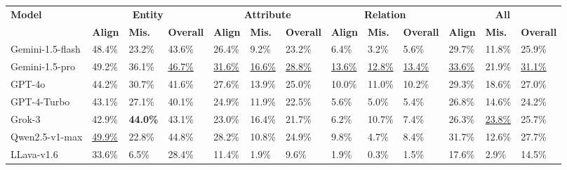 \documentclass[letterpaper]{article} %
\begin{document}
\begin{table}[t]
	\centering
	
	\small %
	\setlength{\tabcolsep}{1mm} %
	
	\begin{tabular}{l|lll|lll|lll|lll}
		\toprule
		\multirow{2}{*}[-0.7ex]{\textbf{Model}} & \multicolumn{3}{c|}{\textbf{Entity}} & \multicolumn{3}{c|}{\textbf{Attribute}} & \multicolumn{3}{c|}{\textbf{Relation}} & \multicolumn{3}{c}{\textbf{All}} \\
		\cmidrule(lr){2-4} \cmidrule(lr){5-7} \cmidrule(lr){8-10} \cmidrule(lr){11-13}
		
		& \textbf{Align} & \textbf{Mis.} & \textbf{Overall} & \textbf{Align} & \textbf{Mis.} & \textbf{Overall} & \textbf{Align} & \textbf{Mis.} & \textbf{Overall} & \textbf{Align} & \textbf{Mis.} & \textbf{Overall} \\
		\midrule
		
		Gemini-1.5-flash & 48.4\% & 23.2\% & 43.6\% & 26.4\% & 9.2\% & 23.2\% & 6.4\% & 3.2\% & 5.6\% & 29.7\% & 11.8\% & 25.9\% \\
		Gemini-1.5-pro   & 49.2\% & 36.1\% & \underline{46.7\%} & \underline{31.6\%} & \underline{16.6\%} & \underline{28.8\%} & \underline{13.6\%} & \underline{12.8\%} & \underline{13.4\%} & \underline{33.6\%} & 21.9\% & \underline{31.1\%} \\
		GPT-4o           & 44.2\% & 30.7\% & 41.6\% & 27.6\% & 13.9\% & 25.0\% & 10.0\% & 11.0\% & 10.2\% & 29.3\% & 18.6\% & 27.0\% \\
		GPT-4-Turbo      & 43.1\% & 27.1\% & 40.1\% & 24.9\% & 11.9\% & 22.5\% & 5.6\% & 5.0\% & 5.4\% & 26.8\% & 14.6\% & 24.2\% \\
		Grok-3           & 42.9\% & \textbf{44.0\%} & 43.1\% & 23.0\% & 16.4\% & 21.7\% & 6.2\% & 10.7\% & 7.4\% & 26.3\% & \underline{23.8\%} & 25.7\% \\
		\midrule
		
		Qwen2.5-v1-max   & \underline{49.9\%} & 22.8\% & 44.8\% & 28.2\% & 10.8\% & 24.9\% & 9.8\% & 4.7\% & 8.4\% & 31.7\% & 12.6\% & 27.7\% \\
		LLava-v1.6       & 33.6\% & 6.5\% & 28.4\% & 11.4\% & 1.9\% & 9.6\% & 1.9\% & 0.3\% & 1.5\% & 17.6\% & 2.9\% & 14.5\% \\
		\midrule
		

\end{tabular}
\end{table}
\end{document}
